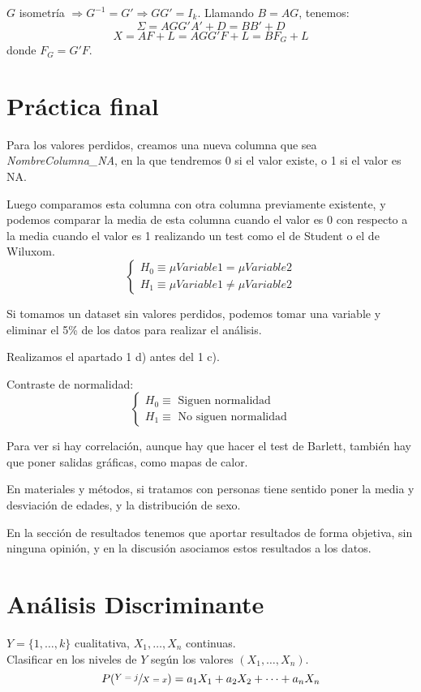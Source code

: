 \documentclass[11pt,a4paper]{article}
\begin{document}
$G$ isometría $\Rightarrow G^{-1} = G' \Rightarrow GG' = I_{k}$.
Llamando $B = AG$, tenemos:
$$\Sigma = AGG'A' + D = BB' + D$$
$$X = AF + L = AGG'F + L = BF_{G} + L$$
donde $F_{G} = G'F$.

\newpage

\section{Práctica final}

Para los valores perdidos, creamos una nueva columna que sea \emph{NombreColumna\_NA}, en la que tendremos 0 si el valor existe, o 1 si el valor es NA.

Luego comparamos esta columna con otra columna previamente existente, y podemos comparar la media de esta columna cuando el valor es 0 con respecto a la media cuando el valor es 1 realizando un test como el de Student o el de Wiluxom.
$$\begin{cases}
H_{0} \equiv \mu Variable1 = \mu Variable2 \\
H_{1} \equiv \mu Variable1 \neq \mu Variable2
\end{cases}$$

Si tomamos un dataset sin valores perdidos, podemos tomar una variable y eliminar el 5\% de los datos para realizar el análisis.

Realizamos el apartado 1 d) antes del 1 c).

Contraste de normalidad:
$$\begin{cases}
H_{0} \equiv \text{ Siguen normalidad} \\
H_{1} \equiv \text{ No siguen normalidad}
\end{cases}$$

Para ver si hay correlación, aunque hay que hacer el test de Barlett, también hay que poner salidas gráficas, como mapas de calor.

En materiales y métodos, si tratamos con personas tiene sentido poner la media y desviación de edades, y la distribución de sexo.

En la sección de resultados tenemos que aportar resultados de forma objetiva, sin ninguna opinión, y en la discusión asociamos estos resultados a los datos.

\newpage

\section{Análisis Discriminante}

$Y = \{1, \dots, k\}$ cualitativa, $X_{1}, \dots, X_{n}$ continuas. \\
Clasificar en los niveles de $Y$ según los valores $(X_{1}, \dots, X_{n})$.
$$P(\sfrac{Y=j}{X=x}) = a_{1}X_{1} + a_{2}X_{2} + \dots + a_{n}X_{n}$$
\end{document}
